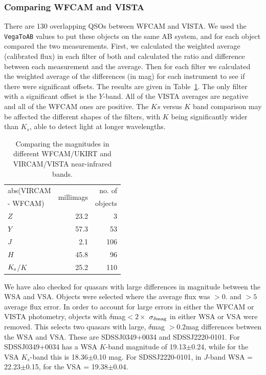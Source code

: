 \documentclass[usenatbib]{mnras}
\begin{document}
  \subsubsection{Comparing WFCAM and VISTA}
  There are 130 overlapping QSOs between WFCAM and VISTA. We used the
  {\tt VegaToAB} values to put these objects on the same AB system, and
  for each object compared the two measurements. First, we calculated the
  weighted average (calibrated flux) in each filter of both and
  calculated the ratio and difference between each measurement and the
  average.  Then for each filter we calculated the weighted average of
  the differences (in mag) for each instrument to see if there were
  significant offsets. The results are given in
  Table~\ref{tab:WFCAM_vs_VISTA}.  The only filter with a significant
  offset is the $Y$-band. All of the VISTA averages are negative and all
  of the WFCAM ones are positive. The $Ks$ versus $K$ band comparison may be
  affected the different shapes of the filters, with $K$ being significantly 
  wider than $K_s$, able to detect light at longer wavelengths.
  \begin{table}
    \centering
    \begin{tabular}{l r r}
      \hline  \hline
      abs(VIRCAM & \multirow{2}{*}{millimags} &  no. of  \\
      -  WFCAM)      &                                        &  objects \\
      \hline
      $Z$                 &  23.2 	& 3 \\
      $Y$                 &  57.3 	& 53 \\
      $J$                  &    2.1 	& 106 \\
      $H$                 &  45.8     &  96 \\
      $K_{\rm s}$/$K$ &  25.2     & 110 \\
      \hline  \hline
    \end{tabular}
    \caption{Comparing the magnitudes in different WFCAM/UKIRT and 
      VIRCAM/VISTA near-infrared bands.}
    \label{tab:WFCAM_vs_VISTA}
  \end{table}
  
  We have also checked for quasars with large differences in magnitude
  between the WSA and VSA. Objects were selected where the average flux
  was $>0.$ and $>5$ average flux error. In order to account for large
  errors in either the WFCAM or VISTA photometry, objects with $\delta$mag$
  < 2 \times$ $\sigma_{\delta\rm mag}$ in either WSA or VSA were removed. This
  selects two quasars with large, $\delta$mag $>0.2$mag differences
  between the WSA and VSA. These are SDSSJ0349+0034 and
  SDSSJ2220-0101. For SDSSJ0349+0034 has a WSA $K$-band magnitude of
  19.13$\pm$0.24, while for the VSA $K_s$-band this is 18.36$\pm$0.10
  mag. For SDSSJ2220-0101, in $J$-band WSA = 22.23$\pm$0.15, for the VSA
  = 19.38$\pm$0.04.
          
\end{document}
